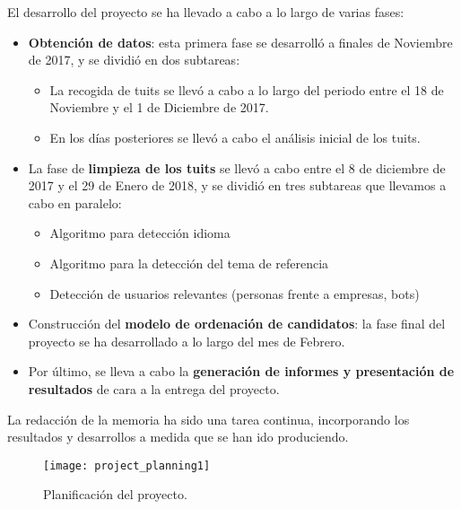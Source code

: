 El desarrollo del proyecto se ha llevado a cabo a lo largo de varias fases:
\begin{itemize}
\item {\bf Obtención de datos}: esta primera fase se desarrolló a finales de Noviembre
de 2017, y se dividió en dos subtareas:
	\begin{itemize}
	\item La recogida de tuits se llevó a cabo a lo largo del periodo entre el 18 de Noviembre
y el 1 de Diciembre de 2017.
	\item En los días posteriores se llevó a cabo el análisis inicial de los tuits.
	\end{itemize}
\item La fase de {\bf limpieza de los tuits} se llevó a cabo entre el 8 de diciembre de 2017 y el 29 de Enero
de 2018, y se dividió en tres subtareas que llevamos a cabo en paralelo:
	\begin{itemize}
	\item Algoritmo para detección idioma
	\item Algoritmo para la detección del tema de referencia 
	\item Detección de usuarios relevantes (personas frente a empresas, bots)
	\end{itemize}
\item Construcción del {\bf modelo de ordenación de candidatos}: la fase final del proyecto se ha desarrollado a lo largo del mes de Febrero.
\item Por último, se lleva a cabo la {\bf generación de informes y presentación de resultados} de cara a la entrega del proyecto.
\end{itemize}
La redacción de la memoria	ha sido una tarea continua, incorporando los 
resultados y desarrollos a medida que se han ido produciendo.

\begin{sidewaysfigure}
\texttt{[image: project\_planning1]}
\caption{Planificación del proyecto.}
\label{fig:planificacion_proyecto}
\end{sidewaysfigure}

